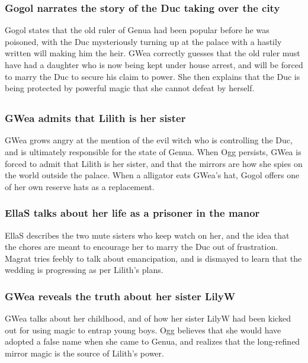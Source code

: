 \subsubsection{\Gls{Gogol} narrates the story of the \Gls{Duc} taking over the city}
\Gls{Gogol} states that the old ruler of Genua had been popular before he was poisoned, with the
\Gls{Duc} mysteriously turning up at the palace with a hastily written will making him the heir.
\Gls{GWea} correctly guesses that the old ruler must have had a daughter who is now being kept under
house arrest, and will be forced to marry the \Gls{Duc} to secure his claim to power. She then
explains that the \Gls{Duc} is being protected by powerful magic that she cannot defeat by herself.

\subsection{}
\subsubsection{\Gls{GWea} admits that \Gls{Lilith} is her sister}
\Gls{GWea} grows angry at the mention of the evil witch who is controlling the \Gls{Duc}, and is
ultimately responsible for the state of Genua. When \Gls{Ogg} persists, \Gls{GWea} is forced to
admit that \Gls{Lilith} is her sister, and that the mirrors are how she spies on the world outside
the palace. When a alligator eats \Gls{GWea}'s hat, \Gls{Gogol} offers one of her own reserve hats
as a replacement.

\subsubsection{\Gls{EllaS} talks about her life as a prisoner in the manor}
\Gls{EllaS} describes the two mute sisters who keep watch on her, and the idea that the chores are
meant to encourage her to marry the \Gls{Duc} out of frustration. \Gls{Magrat} tries feebly to talk
about emancipation, and is dismayed to learn that the wedding is progressing as per \Gls{Lilith}'s
plans.

\subsubsection{\Gls{GWea} reveals the truth about her sister \Gls{LilyW}}
\Gls{GWea} talks about her childhood, and of how her sister \Gls{LilyW} had been kicked out for
using magic to entrap young boys. \Gls{Ogg} believes that she would have adopted a false name when
she came to Genua, and realizes that the long-refined mirror magic is the source of \Gls{Lilith}'s
power.

